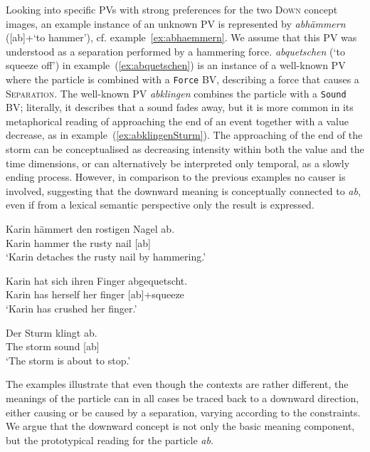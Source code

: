 \documentclass[output=paper]{langsci/langscibook}
\begin{document}
Looking into specific PVs with strong preferences for the two
\textsc{Down} concept images, an example instance of an unknown PV is represented
by \textit{abhämmern} ([ab]+`to hammer'),
cf. example~\ref{ex:abhaemmern}. We assume that this PV was understood
as a separation performed by a hammering force. \textit{abquetschen}
(`to squeeze off') in example~(\ref{ex:abquetschen}) is an instance of
a well-known PV where the particle is combined with a \texttt{Force}
BV, describing a force that causes a \textsc{Separation}. The
well-known PV \textit{abklingen} combines the particle with a
\texttt{Sound} BV; literally, it describes that a sound fades away,
but it is more common in its metaphorical reading of approaching the
end of an event together with a value decrease, as in
example~(\ref{ex:abklingenSturm}). The approaching of the end of the
storm can be conceptualised as decreasing intensity within both the
value and the time dimensions, or can alternatively be interpreted
only temporal, as a slowly ending process. However, in comparison to
the previous examples no causer is involved, suggesting that the
downward meaning is conceptually connected to \textit{ab}, even if
from a lexical semantic perspective only the result is expressed.

\ea\label{ex:abhaemmern}
\gll Karin hämmert den rostigen Nagel ab.\\
Karin hammer the rusty nail [ab]\\
\glt `Karin detaches the rusty nail by hammering.'
\z


\ea\label{ex:abquetschen}
\gll Karin hat sich ihren Finger abgequetscht.\\
Karin has herself her finger [ab]+squeeze\\
\glt `Karin has crushed her finger.'
\z

\ea \label{ex:abklingenSturm}
\gll Der Sturm klingt ab.\\
The storm sound [ab]\\
\glt `The storm is about to stop.'
\z

The examples illustrate that even though the contexts are rather
different, the meanings of the particle can in all cases be traced
back to a downward direction, either causing or be caused by a
separation, varying according to the constraints. We argue that the
downward concept is not only the basic meaning component, but the
prototypical reading for the particle \textit{ab}.
\end{document}
